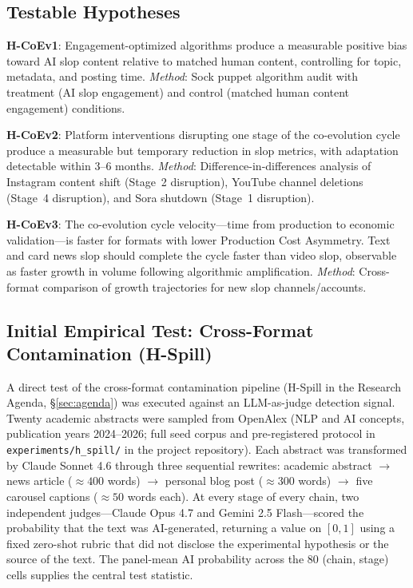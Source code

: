 \documentclass[12pt,a4paper]{article}
\begin{document}
\subsection{Testable Hypotheses}

\textbf{H-CoEv1}: Engagement-optimized algorithms produce a measurable positive bias toward AI slop content relative to matched human content, controlling for topic, metadata, and posting time. \textit{Method}: Sock puppet algorithm audit with treatment (AI slop engagement) and control (matched human content engagement) conditions.

\textbf{H-CoEv2}: Platform interventions disrupting one stage of the co-evolution cycle produce a measurable but temporary reduction in slop metrics, with adaptation detectable within 3--6 months. \textit{Method}: Difference-in-differences analysis of Instagram content shift (Stage~2 disruption), YouTube channel deletions (Stage~4 disruption), and Sora shutdown (Stage~1 disruption).

\textbf{H-CoEv3}: The co-evolution cycle velocity---time from production to economic validation---is faster for formats with lower Production Cost Asymmetry. Text and card news slop should complete the cycle faster than video slop, observable as faster growth in volume following algorithmic amplification. \textit{Method}: Cross-format comparison of growth trajectories for new slop channels/accounts.

\subsection{Initial Empirical Test: Cross-Format Contamination (H-Spill)}
\label{sec:hspill_result}

A direct test of the cross-format contamination pipeline (H-Spill in the Research Agenda, \S\ref{sec:agenda}) was executed against an LLM-as-judge detection signal. Twenty academic abstracts were sampled from OpenAlex (NLP and AI concepts, publication years 2024--2026; full seed corpus and pre-registered protocol in \texttt{experiments/h\_spill/} in the project repository). Each abstract was transformed by Claude Sonnet 4.6 through three sequential rewrites: academic abstract $\to$ news article ($\approx 400$ words) $\to$ personal blog post ($\approx 300$ words) $\to$ five carousel captions ($\approx 50$ words each). At every stage of every chain, two independent judges---Claude Opus 4.7 and Gemini 2.5 Flash---scored the probability that the text was AI-generated, returning a value on $[0, 1]$ using a fixed zero-shot rubric that did not disclose the experimental hypothesis or the source of the text. The panel-mean AI probability across the 80 (chain, stage) cells supplies the central test statistic.
\end{document}
